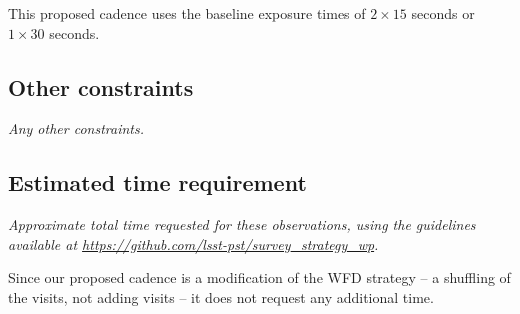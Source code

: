 \documentclass[11pt]{article}
\begin{document}
This proposed cadence uses the baseline exposure times of $2\times15$ seconds or $1\times30$ seconds.

\subsection{Other constraints}
\begin{footnotesize}
{\it Any other constraints.}
\end{footnotesize}

\subsection{Estimated time requirement}
\begin{footnotesize}
{\it Approximate total time requested for these observations, using the guidelines available at \url{https://github.com/lsst-pst/survey_strategy_wp}.}
\end{footnotesize}

Since our proposed cadence is a modification of the WFD strategy -- a shuffling of the visits, not adding visits -- it does not request any additional time.

\vspace{.3in}
\end{document}
